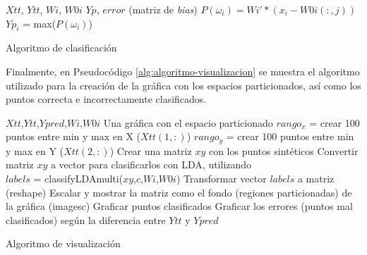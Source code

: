 \documentclass[journal]{IEEEtran}
\begin{document}



\begin{algorithm} 
\footnotesize
\begin{algorithmic}[1] 
\REQUIRE  $Xtt$, $Ytt$, $Wi$, $W0i$
\ENSURE $Yp$, $error$ (matriz de \emph{bias})
\STATE $P(\omega_i) = Wi' * ( x_i - W0i(:,j) )$
\ENDFOR
\STATE $Yp_i$ = max($P(\omega_i)$)
\ENDFOR
\end{algorithmic} 
\caption{Algoritmo de clasificación} 
\label{alg:algoritmo-clasificacion}
\end{algorithm}

Finalmente, en Pseudocódigo \ref{alg:algoritmo-visualizacion} se muestra el algoritmo utilizado para la creación de la gráfica con los espacios particionados, así como los puntos correcta e incorrectamente clasificados.


\begin{algorithm} 
\footnotesize
\begin{algorithmic}[1] 
\REQUIRE  $Xtt$,$Ytt$,$Ypred$,$Wi$,$W0i$
\ENSURE Una gráfica con el espacio particionado
\STATE $rango_x$ = crear 100 puntos entre min y max en X ($Xtt(1,:)$)
\STATE $rango_y$ = crear 100 puntos entre min y max en Y ($Xtt(2,:)$)
\STATE Crear una matriz $xy$ con los puntos sintéticos
\STATE Convertir matriz $xy$ a vector para clasificarlos con LDA, utilizando\\
$labels$ = classifyLDAmulti($xy$,$c$,$Wi$,$W0i$)
\STATE Transformar vector $labels$ a matriz (reshape)
\STATE Escalar y mostrar la matriz como el fondo (regiones particionadas) de la gráfica (imagesc)
\STATE Graficar puntos clasificados
\STATE Graficar los errores (puntos mal clasificados) según la diferencia entre $Ytt$ y $Ypred$
\end{algorithmic} 
\caption{Algoritmo de visualización} 
\label{alg:algoritmo-visualizacion}
\end{algorithm}
\end{document}
